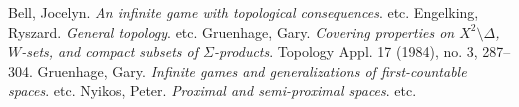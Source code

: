 \documentclass{amsart}
\theoremstyle{definition}
\theoremstyle{remark}
\newcommand{\oneptcomp}[1]{{#1}^*}
\newcommand{\<}{\langle}
\renewcommand{\>}{\rangle}
\newcommand{\congame}[2]{Con_{O,P}(#1,#2)}
\newcommand{\clusgame}[2]{Clus_{O,P}(#1,#2)}
\newcommand{\pl}[1]{\mathscr{#1}}
\newcommand{\win}{\uparrow}
\newcommand{\markwin}{\win_{\textrm{mark}}}
\begin{document}


\newpage
\begin{thebibliography}{99}
  Bell, Jocelyn.
  \emph{An infinite game with topological consequences}.
  etc.
  Engelking, Ryszard.
  \emph{General topology}.
  etc.
  Gruenhage, Gary.
  \emph{Covering properties on $X^2\setminus\Delta$, $W$-sets, and compact subsets of $\Sigma$-products}. 
  Topology Appl. 17 (1984), no. 3, 287–304.
  Gruenhage, Gary.
  \emph{Infinite games and generalizations of first-countable spaces}. 
  etc.
  Nyikos, Peter.
  \emph{Proximal and semi-proximal spaces}.
  etc.
\end{thebibliography}
\end{document}
